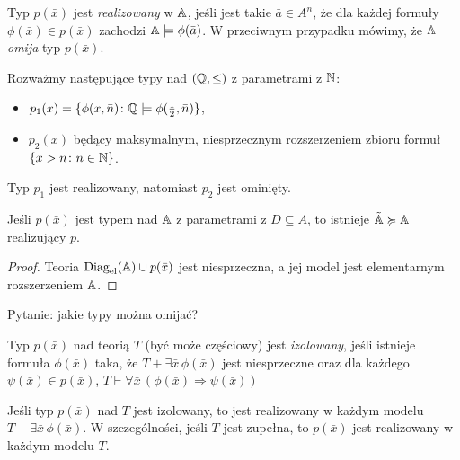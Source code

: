 \documentclass{article}
\begin{document}
\begin{df}
	Typ $p(\bar{x})$ jest \textit{realizowany} w $\mathbb{A}$, jeśli jest takie $\bar{a} \in A^n$, że dla każdej formuły $\phi(\bar{x}) \in p(\bar{x})$ zachodzi $\mathbb{A} \models \phi(\bar{a})$.
	W przeciwnym przypadku mówimy, że $\mathbb{A}$ \textit{omija} typ $p(\bar{x})$.
\end{df}

\begin{prz}
	Rozważmy następujące typy nad $(\mathbb{Q}, \leq)$ z parametrami z $\mathbb{N}$:
	\begin{itemize}
		\item $p_1(x) = \{\phi(x, \bar{n}) \colon \mathbb{Q} \models \phi(\frac{1}{2}, \bar{n})\}$,
		\item $p_2(x)$ będący maksymalnym, niesprzecznym rozszerzeniem zbioru formuł $\{x > n \colon n \in \mathbb{N}\}$.
	\end{itemize}
	Typ $p_1$ jest realizowany, natomiast $p_2$ jest ominięty.
\end{prz}

\begin{stw}
	Jeśli $p(\bar{x})$ jest typem nad $\mathbb{A}$ z parametrami z $D \subseteq A$,
	 to istnieje $\tilde{\mathbb{A}} \succcurlyeq \mathbb{A}$ realizujący $p$.
\end{stw}
\begin{proof}
	Teoria $\text{Diag}_{\text{el}}(\mathbb{A}) \cup p(\bar{x})$ jest niesprzeczna, a jej model jest elementarnym rozszerzeniem $\mathbb{A}$.
\end{proof}


Pytanie: jakie typy można omijać?


\begin{df}
	Typ $p(\bar{x})$ nad teorią $T$ (być może częściowy) jest \textit{izolowany},
	jeśli istnieje formuła $\phi(\bar{x})$ taka, że $T + \exists \bar{x}\, \phi(\bar{x})$ jest niesprzeczne oraz dla każdego $\psi(\bar{x}) \in p(\bar{x})$, $T \vdash \forall \bar{x} \, (\phi(\bar{x}) \Rightarrow \psi(\bar{x}))$
\end{df}

\begin{stw}
	Jeśli typ $p(\bar{x})$ nad $T$ jest izolowany, to jest realizowany w każdym modelu $T + \exists \bar{x} \, \phi(\bar{x})$.
	W szczególności, jeśli $T$ jest zupełna, to $p(\bar{x})$ jest realizowany w każdym modelu $T$.
\end{stw}
\end{document}
